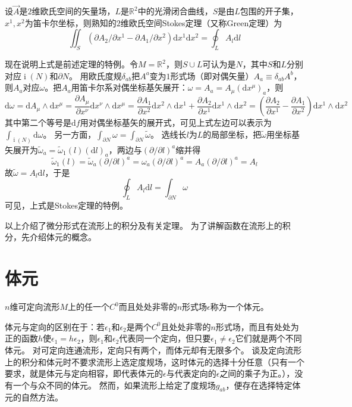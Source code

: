 \begin{example}
    设$\vec{A}$是$2$维欧氏空间的矢量场，$L$是$\mathbb{R}^2$中的光滑闭合曲线，$S$是由$L$包围的开子集，$x^1, x^2$为笛卡尔坐标，则熟知的$2$维欧氏空间Stokes定理（又称Green定理）为
    $$\iint_S(\partial A_2 / \partial x^1 - \partial A_1 / \partial x^2)\mathrm{d}x^1\mathrm{d}x^2 = \oint_LA_l\mathrm{d}l$$

    现在说明上式是前述定理的特例。令$M = \mathbb{R}^2$，则$S \cup L$可认为是$N$，其中$S$和$L$分别对应$\operatorname{i}(N)$和$\partial N$。
    用欧氏度规$\delta_{ab}$把$A^a$变为$1$形式场（即对偶矢量）$A_a \equiv \delta_{ab}A^b$，则$A_a$对应$\omega$。把$A_a$用笛卡尔系对偶坐标基矢展开：$\omega = A_a = A_\mu(\mathrm{d}x^\mu)_a$，则
    $$\mathrm{d}\omega = \mathrm{d}A_\mu \wedge \mathrm{d}x^\mu = \frac{\partial A_\mu}{\partial x^\nu}\mathrm{d}x^\nu \wedge \mathrm{d}x^\mu = \frac{\partial A_1}{\partial x^2}\mathrm{d}x^2 \wedge \mathrm{d}x^1 + \frac{\partial A_2}{\partial x^1}\mathrm{d}x^1 \wedge \mathrm{d}x^2 = (\frac{\partial A_2}{\partial x^1} - \frac{\partial A_1}{\partial x^2})\mathrm{d}x^1 \wedge \mathrm{d}x^2$$
    其中第二个等号是$\mathrm{d}f$用对偶坐标基矢的展开式，可见上式左边可以表示为$\displaystyle\int_{\operatorname{i}(N)}\mathrm{d}\omega$。
    另一方面，$\displaystyle\int_{\partial N}\omega = \int_{\partial N}\tilde\omega$。
    选线长$l$为$L$的局部坐标，把$\tilde\omega$用坐标基矢展开为$\tilde\omega_a = \tilde\omega_1(l)(\mathrm{d}l)_a$，两边与$(\partial / \partial l)^a$缩并得
    $$\tilde\omega_1(l) = \tilde\omega_a(\partial / \partial l)^a = \omega_a(\partial / \partial l)^a = A_a(\partial / \partial l)^a = A_l$$
    故$\tilde\omega = A_l\mathrm{d}l$，于是
    $$\oint_L A_l\mathrm{d}l = \int_{\partial N}\omega$$
    可见，上式是Stokes定理的特例。
\end{example}

以上介绍了微分形式在流形上的积分及有关定理。
为了讲解函数在流形上的积分，先介绍体元的概念。

\section{体元}

\begin{definition}
    $n$维可定向流形$M$上的任一个$C^0$而且处处非零的$n$形式场$\epsilon$称为一个体元。
\end{definition}

\begin{note}
    体元与定向的区别在于：若$\epsilon_1$和$\epsilon_2$是两个$C^0$且处处非零的$n$形式场，而且有处处为正的函数$h$使$\epsilon_1 = h \epsilon_2$，则$\epsilon_1$和$\epsilon_2$代表同一个定向，但只要$\epsilon_1 \neq \epsilon_2$它们就是两个不同体元。
    对可定向连通流形，定向只有两个，而体元却有无限多个。
    谈及定向流形上的积分和体元时不要求流形上选定度规场，这时体元的选择十分任意（只有一个要求，就是体元与定向相容，即代表体元的$\epsilon$与代表定向的$\epsilon$之间的乘子为正。），没有一个与众不同的体元。
    然而，如果流形上给定了度规场$g_{ab}$，便存在选择特定体元的自然方法。
\end{note}

